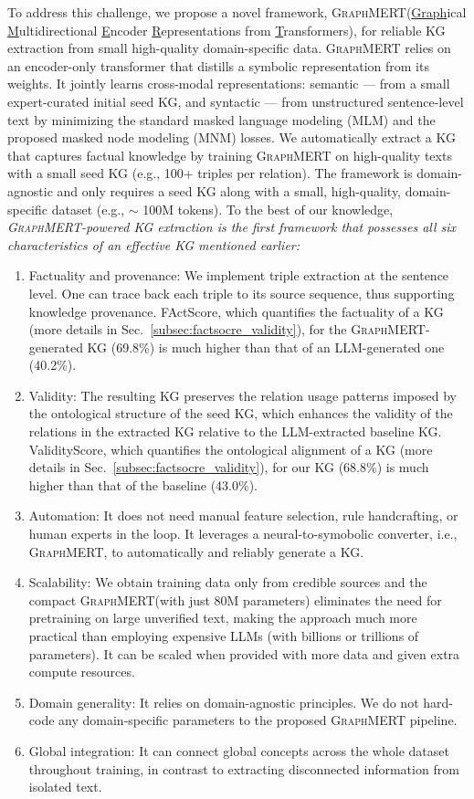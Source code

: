 \documentclass[10pt]{article}
\newcommand{\ours}{\textsc{GraphMERT}\xspace}
\begin{document}
To address this challenge, we propose a novel framework, \ours (\underline{Graph}ical \underline{M}ultidirectional \underline{E}ncoder \underline{R}epresentations from \underline{T}ransformers), for reliable KG extraction from small high-quality domain-specific data. \ours relies on an encoder-only transformer that distills a symbolic representation from its weights. It jointly learns cross-modal representations: semantic --- from a small expert-curated initial seed KG, and syntactic --- from unstructured sentence-level text by minimizing the standard masked language modeling (MLM) and the proposed masked node modeling (MNM) losses. We automatically extract a KG that captures factual knowledge by training \ours on high-quality texts with a small seed KG (e.g., 100+ triples per relation). The framework is domain-agnostic and only requires a seed KG along with a small, high-quality, domain-specific dataset (e.g., $\sim$ 100M tokens). To the best of our knowledge, {\em \ours-powered KG extraction is the first framework that possesses all six characteristics of an effective KG mentioned earlier:}
\begin{enumerate}
    \item Factuality and provenance: We implement triple extraction at the sentence level. One can trace back each triple to its source sequence, thus supporting knowledge provenance. FActScore, which quantifies the factuality of a KG (more details in Sec.~\ref{subsec:factsocre_validity}), for the \ours-generated KG (69.8\%) is much higher than that of an LLM-generated one (40.2\%).
    \item Validity: The resulting KG preserves the relation usage patterns imposed by the ontological structure of the seed KG, which enhances the validity of the relations in the extracted KG relative to the LLM-extracted baseline KG. ValidityScore, which quantifies the ontological alignment of a KG (more details in Sec.~\ref{subsec:factsocre_validity}), for our KG (68.8\%) is much higher than that of the baseline (43.0\%).
    \item Automation: It does not need manual feature selection, rule handcrafting, or human experts in the loop. It leverages a neural-to-symobolic converter, i.e., \ours, to automatically and reliably generate a KG.
    \item Scalability: We obtain training data only from credible sources and the compact \ours (with just 80M parameters) eliminates the need for pretraining on large unverified text, making the approach much more practical than employing expensive LLMs (with billions or trillions of parameters). It can be scaled when provided with more data and given extra compute resources.
    \item Domain generality: It relies on domain-agnostic principles. We do not hard-code any domain-specific parameters to the proposed \ours pipeline.
    \item Global integration: It can connect global concepts across the whole dataset throughout training, in contrast to extracting disconnected information from isolated text.
\end{enumerate}
  
\end{document}
